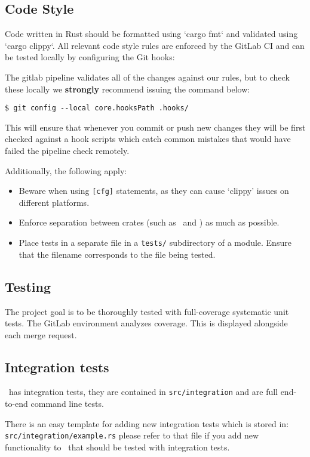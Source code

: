 \subsection{Code Style}

Code written in Rust should be formatted using `cargo fmt` and validated using `cargo clippy`.
All relevant code style rules are enforced by the GitLab CI and can be tested locally
by configuring the Git hooks:

The gitlab pipeline validates all of the changes against our rules, but to check these locally
we \textbf{strongly} recommend issuing the command below:

\begin{verbatim}
$ git config --local core.hooksPath .hooks/
\end{verbatim}

This will ensure that whenever you commit or push new changes they will be first checked against
a hook scripts which catch common mistakes that would have failed the pipeline check remotely.

Additionally, the following apply:
\begin{itemize}
  \item Beware when using \verb|[cfg]| statements, as they can cause `clippy' issues on different platforms.
  \item Enforce separation between crates (such as \gourd\ and \gourdwrap) as much as possible.
  \item Place tests in a separate file in a \verb|tests/| subdirectory of a module.
        Ensure that the filename corresponds to the file being tested.
\end{itemize}

\subsection{Testing}

The project goal is to be thoroughly tested with full-coverage systematic unit tests.
The GitLab environment analyzes coverage. This is displayed alongside each merge request.

\subsection{Integration tests}

\gourd\ has integration tests, they are contained in \texttt{src/integration} and
are full end-to-end command line tests.

There is an easy template for adding new integration tests which is stored in: \\
\texttt{src/integration/example.rs} please refer to that file if you add
new functionality to \gourd\ that should be tested with integration tests.

